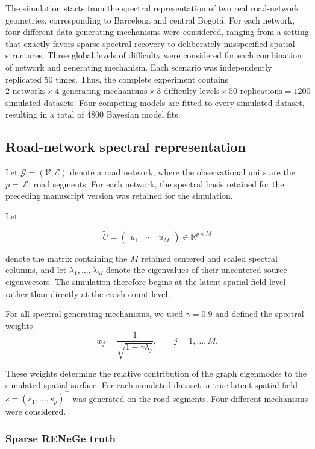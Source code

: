 \documentclass[11pt]{article}
\begin{document}
The simulation starts from the spectral representation of two real road-network geometries, corresponding to Barcelona and central Bogotá. For each network, four different data-generating mechanisms were considered, ranging from a setting that exactly favors sparse spectral recovery to deliberately misspecified spatial structures. Three global levels of difficulty were considered for each combination of network and generating mechanism. Each scenario was independently replicated 50 times. Thus, the complete experiment contains $ 2 \text{ networks} \times4 \text{ generating mechanisms} \times 3 \text{ difficulty levels} \times 50 \text{ replications} = 1200 $ simulated datasets. Four competing models are fitted to every simulated dataset, resulting in a total of 4800 Bayesian model fits.

\subsection{Road-network spectral representation}

Let $\mathcal{G}=(\mathcal{V},\mathcal{E})$ denote a road network, where the observational units are the $p=|\mathcal{E}|$ road segments. For each network, the spectral basis retained for the preceding manuscript version was retained for the simulation.

Let

\[
\widetilde U=
\begin{pmatrix}
	\widetilde u_1 & \cdots & \widetilde u_M
\end{pmatrix}
\in\mathbb{R}^{p\times M}
\]

denote the matrix containing the $M$ retained centered and scaled spectral columns, and let $ \lambda_1,\ldots,\lambda_M$ denote the eigenvalues of their uncentered source eigenvectors. The simulation therefore begins at the latent spatial-field level rather than directly at the crash-count level.

For all spectral generating mechanisms, we used $\gamma=0.9$ and defined the spectral weights
\[
w_j
=
\frac{1}{\sqrt{1-\gamma\lambda_j}},
\qquad
j=1,\ldots,M.
\]

These weights determine the relative contribution of the graph eigenmodes to the simulated spatial surface. For each simulated dataset, a true latent spatial field $s=(s_1,\ldots,s_p)^\top$ was generated on the road segments. Four different mechanisms were considered.

\subsubsection{Sparse RENeGe truth}
\end{document}
